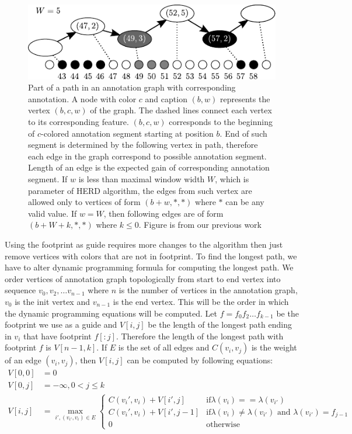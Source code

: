 \begin{figure}
\begin{center}
\includegraphics{../figures/herd_graph}
\end{center} 
\caption[Annotation graph]{Part of a path in an annotation graph with
corresponding annotation. A node with color $c$ and caption $(b,w)$ represents
the vertex $(b,c,w)$ of the graph. The dashed lines connect each vertex to its
corresponding feature. $(b, c, w)$ corresponds to the beginning of $c$-colored
annotation segment starting at position $b$. End of such segment is determined
by the following vertex in path, therefore each edge in the graph correspond to
possible annotation segment. Length of an edge is the expected gain of
corresponding annotation segment. If $w$ is less than maximal window width $W$,
which is parameter of HERD algorithm, the edges from such vertex are allowed
only to vertices of form $(b+w, *, *)$ where $*$ can be any valid value. If
$w=W$, then following edges are of form $(b+W+k, *, *)$ where $k\leq0$.  Figure is
from our previous work \cite{Nanasi2010mgr}}\label{HERD:figure:annotation_graph} 
\end{figure}

Using the footprint as guide requires more changes to the algorithm then just
remove vertices with colors that are not in footprint. To find the longest path,
we have to alter dynamic programming formula for computing the longest path.
We order vertices of annotation graph topologically from start to end vertex
into sequence $v_0, v_2, \dots v_{n-1}$ where $n$ is the number of vertices in
the annotation graph, $v_0$ is the init vertex and $v_{n-1}$ is the end vertex.
This will be the order in which the dynamic programming equations will be
computed.
Let $f=f_0f_2\dots f_{k-1}$ be the footprint we use as a guide and $V[i, j]$ be the length
of the longest path ending in $v_i$ that have footprint $f[:j]$.  Therefore the
length of the longest path with footprint $f$ is $V[n - 1, k]$. If $E$ is the set of
all edges and $C(v_i, v_j)$ is the weight of an edge $(v_i, v_j)$, then $V[i,
j]$ can be computed by following equations: 
\begin{align} V[0, 0] &= 0 \\ V[0, j] &= -\infty, 0< j \leq k \\ V[i, j] &=
\max_{i', (v_{i'}, v_i)\in E} \begin{cases} C(v_i', v_i) + V[i', j]& \text{if
$\lambda(v_i) == \lambda(v_{i'})$}\\ C(v_i', v_i) + V[i', j-1]& \text{if
$\lambda(v_i) \not= \lambda(v_{i'})$ and $\lambda(v_{i'})=f_{j-1}$}\\ 0 &
\text{otherwise} \end{cases} \end{align}

